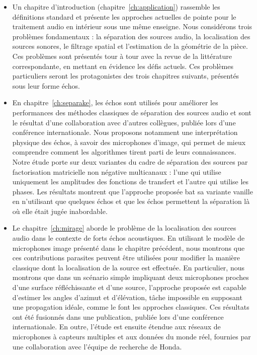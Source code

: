 \begin{itemize}
    \item
    Un chapitre d'introduction (chapitre~\ref{ch:application}) rassemble les définitions standard et présente les approches actuelles de pointe pour le traitement audio en intérieur sous une même enseigne.
    Nous considérons trois problèmes fondamentaux : la séparation des sources audio, la localisation des sources sonores, le filtrage spatial et l'estimation de la géométrie de la pièce.
    Ces problèmes sont présentés tour à tour avec la revue de la littérature correspondante, en mettant en évidence les défis actuels.
    Ces problèmes particuliers seront les protagonistes des trois chapitres suivants, présentés sous leur forme échos.
    \item
    En chapitre~\ref{ch:separake}, les échos sont utilisés pour améliorer les performances des méthodes classiques de séparation des sources audio et sont le résultat d'une collaboration avec d'autres collègues, publiée lors d'une conférence internationale.
    Nous proposons notamment une interprétation physique des échos, à savoir des microphones d'image, qui permet de mieux comprendre comment les algorithmes tirent parti de leurs connaissances.
    Notre étude porte sur deux variantes du cadre de séparation des sources par factorisation matricielle non négative multicanaux : l'une qui utilise uniquement les amplitudes des fonctions de transfert et l'autre qui utilise les phases.
    Les résultats montrent que l'approche proposée bat sa variante vanille en n'utilisant que quelques échos et que les échos permettent la séparation là où elle était jugée inabordable.
    \item
    Le chapitre~\ref{ch:mirage} aborde le problème de la localisation des sources audio dans le contexte de forts échos acoustiques. En utilisant le modèle de microphones image présenté dans le chapitre précédent, nous montrons que ces contributions parasites peuvent être utilisées pour modifier la manière classique dont la localisation de la source est effectuée.
    En particulier, nous montrons que dans un scénario simple impliquant deux microphones proches d'une surface réfléchissante et d'une source, l'approche proposée est capable d'estimer les angles d'azimut et d'élévation, tâche impossible en supposant une propagation idéale, comme le font les approches classiques.
    Ces résultats ont été fusionnés dans une publication, publiée lors d'une conférence internationale.
    En outre, l'étude est ensuite étendue aux réseaux de microphones à capteurs multiples et aux données du monde réel, fournies par une collaboration avec l'équipe de recherche de Honda.

\end{itemize}
